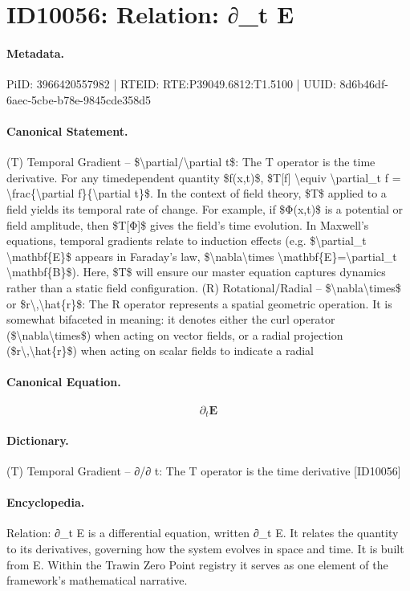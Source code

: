\section*{ID10056: Relation: ∂\_t E}
\paragraph{Metadata.}
PiID: 3966420557982 | RTEID: RTE:P39049.6812:T1.5100 | UUID: 8d6b46df-6aec-5cbe-b78e-9845cde358d5

\paragraph{Canonical Statement.}
(T) Temporal Gradient – \$\textbackslash{}partial/\textbackslash{}partial t\$: The T operator is the time derivative. For any timedependent quantity \$f(x,t)\$, \$T[f] \textbackslash{}equiv \textbackslash{}partial\_t f = \textbackslash{}frac\{\textbackslash{}partial f\}\{\textbackslash{}partial t\}\$. In the context of field theory, \$T\$ applied to a field yields its temporal rate of change. For example, if \$Φ(x,t)\$ is a potential or field amplitude, then \$T[Φ]\$ gives the field’s time evolution. In Maxwell’s equations, temporal gradients relate to induction effects (e.g. \$\textbackslash{}partial\_t \textbackslash{}mathbf\{E\}\$ appears in Faraday’s law, \$\textbackslash{}nabla\textbackslash{}times \textbackslash{}mathbf\{E\}=\textbackslash{}partial\_t \textbackslash{}mathbf\{B\}\$). Here, \$T\$ will ensure our master equation captures dynamics rather than a static field configuration. (R) Rotational/Radial – \$\textbackslash{}nabla\textbackslash{}times\$ or \$r\textbackslash{},\textbackslash{}hat\{r\}\$: The R operator represents a spatial geometric operation. It is somewhat bifaceted in meaning: it denotes either the curl operator (\$\textbackslash{}nabla\textbackslash{}times\$) when acting on vector fields, or a radial projection (\$r\textbackslash{},\textbackslash{}hat\{r\}\$) when acting on scalar fields to indicate a radial

\paragraph{Canonical Equation.}
\[
\partial_t \mathbf{E}
\]

\paragraph{Dictionary.}
(T) Temporal Gradient – ∂/∂ t: The T operator is the time derivative [ID10056]

\paragraph{Encyclopedia.}
Relation: ∂\_t E is a differential equation, written ∂\_t E. It relates the quantity to its derivatives, governing how the system evolves in space and time. It is built from E. Within the Trawin Zero Point registry it serves as one element of the framework's mathematical narrative.
